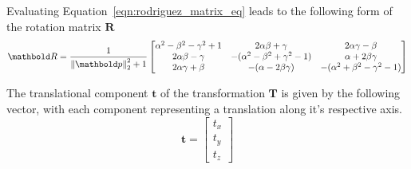 Evaluating Equation~\ref{eqn:rodriguez_matrix_eq} leads to the following form
of the rotation matrix \(\bm{R}\)
\begin{equation}
  \label{eqn:rodriguez_matrix}
  \bm{R} = \frac{1}{\norm{\bm{p}}^{2} + 1}
  \begin{bmatrix}
    \alpha^{2} - \beta^{2} - \gamma^{2} + 1 &
    2 \alpha \beta + \gamma &
    2 \alpha \gamma - \beta \\
    2 \alpha \beta - \gamma &
    -(\alpha^{2} - \beta^{2} + \gamma^{2} - 1) &
    \alpha + 2 \beta \gamma \\
    2 \alpha \gamma + \beta &
    -(\alpha - 2 \beta \gamma) &
    -(\alpha^{2} + \beta^{2} - \gamma^{2} - 1)
  \end{bmatrix}
\end{equation}

The translational component \(\bm{t}\) of the transformation \(\bm{T}\) is
given by the following vector, with each component representing a translation
along it's respective axis.
\begin{equation}
  \label{eqn:trans_vector}
  \bm{t} =
  \begin{bmatrix}
    t_{x} \\
    t_{y} \\
    t_{z}
  \end{bmatrix}
\end{equation}

